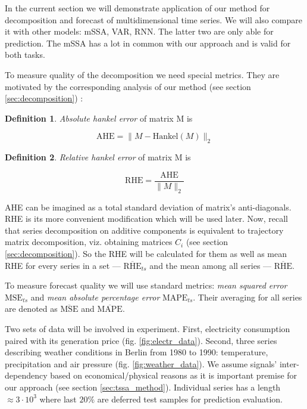 \documentclass[referee, pdflatex]{sn-jnl}
\theoremstyle{definition}
\newtheorem*{Def}{Definition}
\theoremstyle{plain}
\begin{document}
	In the current section we will demonstrate application of our method for decomposition and forecast of multidimensional time series. We will also compare it with other models: mSSA, VAR, RNN. The latter two are only able for prediction. The mSSA has a lot in common with our approach and is valid for both tasks.
	
	To measure quality of the decomposition we need special metrics. They are motivated by the corresponding analysis of our method (see section \ref{sec:decomposition}) :
	
	\begin{Def}
		\emph{Absolute hankel error} of matrix M is 
		
		\[
		\text{AHE} = \lVert M - \text{Hankel}(M) \rVert_2
		\] 
		
	\end{Def}	
	
	\begin{Def}		
		
		\emph{Relative hankel error} of matrix M is 
		
		\[
		\text{RHE} = \frac{\text{AHE}}{\lVert M \rVert_2} 
		\] 		
		
	\end{Def}
	
	AHE can be imagined as a total standard deviation of matrix's anti-diagonals. RHE is its more convenient modification which will be used later.	Now, recall that series decomposition on additive components is equivalent to trajectory matrix decomposition, viz. obtaining matrices $ C_i $ (see section \ref{sec:decomposition}). So the RHE will be calculated for them as well as mean RHE for every series in a set --- $ \overline{\text{RHE}}_{ts} $ and the mean among all series --- $ \overline{\text{RHE}} $. 
	
	To measure forecast quality we will use standard metrics: \emph{mean squared error} $ \text{MSE}_{ts} $ and \emph{mean absolute percentage error} $ \text{MAPE}_{ts} $. Their averaging for all series are denoted as $ \overline{\text{MSE}} $ and $ \overline{\text{MAPE}} $.
	
	Two sets of data will be involved in experiment. First, electricity consumption paired with its generation price (fig. \ref{fig:electr_data}). Second, three series describing weather conditions in Berlin from 1980 to 1990: temperature, precipitation and air pressure (fig. \ref{fig:weather_data}). We assume signals' inter-dependency based on economical/physical reasons as it is important premise for our approach (see section \ref{sec:tssa_method}). Individual series has a length $ \approx 3 \cdot 10^3 $ where last $ 20\% $ are deferred test samples for prediction evaluation.
	
\end{document}
